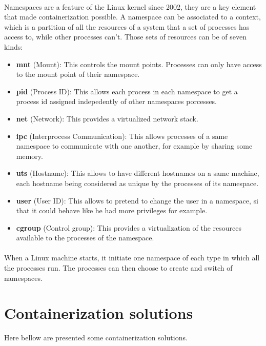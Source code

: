 \paragraph{}Namespaces are a feature of the Linux kernel since 2002, they are a key element that made containerization possible.  A namespace can be associated to a context, which is a partition of all the resources of a system that a set of processes has access to, while other processes can't.  Those sets of resources can be of seven kinds:
\begin{itemize}
\renewcommand\labelitemi{--}
  \item \textbf{mnt} (Mount): This controls the mount points.  Processes can only have access to the mount point of their namespace.
  \item \textbf{pid} (Process ID): This allows each process in each namespace to get a process id assigned indepedently of other namespaces porcesses.
  \item \textbf{net} (Network): This provides a virtualized network stack.
  \item \textbf{ipc} (Interprocess Communication): This allows processes of a same namespace to communicate with one another, for example by sharing some memory.
  \item \textbf{uts} (Hostname): This allows to have different hostnames on a same machine, each hostname being considered as unique by the processes of its namespace.
  \item \textbf{user} (User ID): This allows to pretend to change the user in a namespace, si that it could behave like he had more privileges for example.
  \item \textbf{cgroup} (Control group): This provides a virtualization of the resources available to the processes of the namespace.
\end{itemize}

\paragraph{}When a Linux machine starts, it initiate one namespace of each type in which all the processes run.  The processes can then choose to create and switch of namespaces.

\section{Containerization solutions}

Here bellow are presented some containerization solutions.


